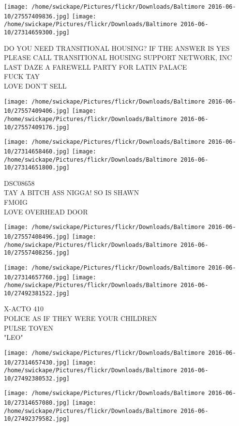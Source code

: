 \documentclass[10pt,letterpaper]{article}
\begin{document}
\texttt{[image: /home/swickape/Pictures/flickr/Downloads/Baltimore 2016-06-10/27557409836.jpg]}
\texttt{[image: /home/swickape/Pictures/flickr/Downloads/Baltimore 2016-06-10/27314659300.jpg]}

DO YOU NEED TRANSITIONAL HOUSING?  IF THE ANSWER IS YES PLEASE CALL TRANSITIONAL HOUSING SUPPORT NETWORK, INC\\
LAST DAZE A FAREWELL PARTY FOR LATIN PALACE\\
FUCK TAY\\
LOVE DON'T SELL\\
\pagebreak

\texttt{[image: /home/swickape/Pictures/flickr/Downloads/Baltimore 2016-06-10/27557409406.jpg]}
\texttt{[image: /home/swickape/Pictures/flickr/Downloads/Baltimore 2016-06-10/27557409176.jpg]}

\texttt{[image: /home/swickape/Pictures/flickr/Downloads/Baltimore 2016-06-10/27314658460.jpg]}
\texttt{[image: /home/swickape/Pictures/flickr/Downloads/Baltimore 2016-06-10/27314651800.jpg]}

DSC08658\\
TAY A BITCH ASS NIGGA!  SO IS SHAWN\\
FMOIG\\
LOVE OVERHEAD DOOR\\
\pagebreak

\texttt{[image: /home/swickape/Pictures/flickr/Downloads/Baltimore 2016-06-10/27557408496.jpg]}
\texttt{[image: /home/swickape/Pictures/flickr/Downloads/Baltimore 2016-06-10/27557408256.jpg]}

\texttt{[image: /home/swickape/Pictures/flickr/Downloads/Baltimore 2016-06-10/27314657760.jpg]}
\texttt{[image: /home/swickape/Pictures/flickr/Downloads/Baltimore 2016-06-10/27492381522.jpg]}

X{-}ACTO 410\\
POLICE AS IF THEY WERE YOUR CHILDREN\\
PULSE TOVEN\\
"LEO"\\
\pagebreak

\texttt{[image: /home/swickape/Pictures/flickr/Downloads/Baltimore 2016-06-10/27314657430.jpg]}
\texttt{[image: /home/swickape/Pictures/flickr/Downloads/Baltimore 2016-06-10/27492380532.jpg]}

\texttt{[image: /home/swickape/Pictures/flickr/Downloads/Baltimore 2016-06-10/27314657080.jpg]}
\texttt{[image: /home/swickape/Pictures/flickr/Downloads/Baltimore 2016-06-10/27492379582.jpg]}
\end{document}
